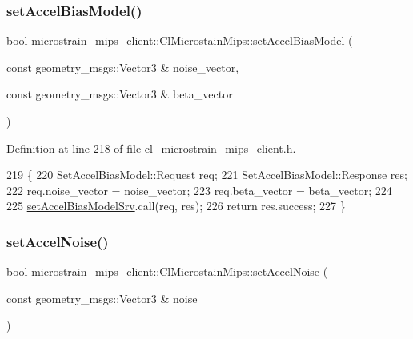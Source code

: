 \subsubsection{\texorpdfstring{set\+Accel\+Bias\+Model()}{setAccelBiasModel()}}
{\footnotesize\ttfamily \hyperlink{classbool}{bool} microstrain\+\_\+mips\+\_\+client\+::\+Cl\+Microstain\+Mips\+::set\+Accel\+Bias\+Model (\begin{DoxyParamCaption}\item[{const geometry\+\_\+msgs\+::\+Vector3 \&}]{noise\+\_\+vector,  }\item[{const geometry\+\_\+msgs\+::\+Vector3 \&}]{beta\+\_\+vector }\end{DoxyParamCaption})\hspace{0.3cm}{\ttfamily [inline]}}



Definition at line 218 of file cl\+\_\+microstrain\+\_\+mips\+\_\+client.\+h.


\begin{DoxyCode}
219     \{
220         SetAccelBiasModel::Request req;
221         SetAccelBiasModel::Response res;
222         req.noise\_vector = noise\_vector;
223         req.beta\_vector = beta\_vector;
224 
225         \hyperlink{classmicrostrain__mips__client_1_1ClMicrostainMips_ab6245e0d38719e0cb59dc7efc8539d24}{setAccelBiasModelSrv}.call(req, res);
226         \textcolor{keywordflow}{return} res.success;
227     \}
\end{DoxyCode}
\mbox{\label{classmicrostrain__mips__client_1_1ClMicrostainMips_a303546d138e32bb523aa3aa80ef34d70}} 
\subsubsection{\texorpdfstring{set\+Accel\+Noise()}{setAccelNoise()}}
{\footnotesize\ttfamily \hyperlink{classbool}{bool} microstrain\+\_\+mips\+\_\+client\+::\+Cl\+Microstain\+Mips\+::set\+Accel\+Noise (\begin{DoxyParamCaption}\item[{const geometry\+\_\+msgs\+::\+Vector3 \&}]{noise }\end{DoxyParamCaption})\hspace{0.3cm}{\ttfamily [inline]}}



